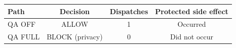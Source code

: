 \begin{tabular}{@{}lccc@{}}
\toprule
\textbf{Path} & \textbf{Decision} & \textbf{Dispatches} & \textbf{Protected side effect} \\
\midrule
QA OFF & ALLOW & 1 & Occurred \\
QA FULL & BLOCK (privacy) & 0 & Did not occur \\
\bottomrule
\end{tabular}
